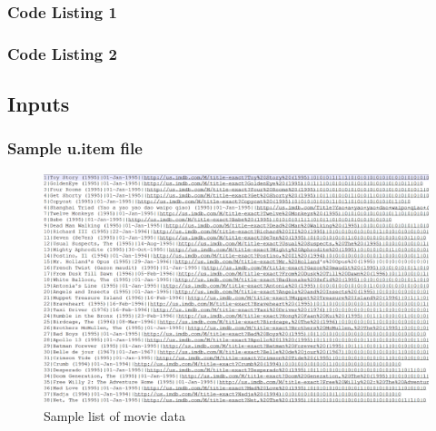 \subsubsection{Code Listing 1}


\newpage

\subsubsection{Code Listing 2}


\newpage

\subsection{Inputs}
\subsubsection{Sample u.item file}
\begin{figure}[ht]    
    \begin{center}
        \includegraphics[scale=0.4]{sample_uitem.png}
        \caption{Sample list of movie data}
        \label{Sample4_t1}
    \end{center}
\end{figure}
\newpage
